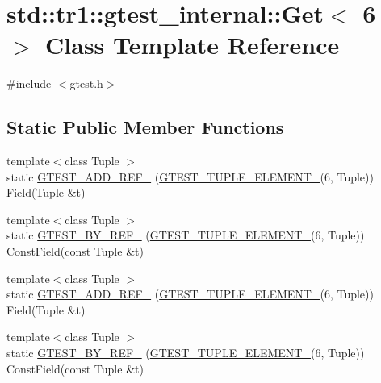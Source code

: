 \hypertarget{classstd_1_1tr1_1_1gtest__internal_1_1_get_3_016_01_4}{\section{std\-:\-:tr1\-:\-:gtest\-\_\-internal\-:\-:Get$<$ 6 $>$ Class Template Reference}
\label{classstd_1_1tr1_1_1gtest__internal_1_1_get_3_016_01_4}
}


{\ttfamily \#include $<$gtest.\-h$>$}

\subsection*{Static Public Member Functions}
\begin{DoxyCompactItemize}
\item 
{\footnotesize template$<$class Tuple $>$ }\\static \hyperlink{classstd_1_1tr1_1_1gtest__internal_1_1_get_3_016_01_4_a28034152d066c8644fa55e9fc0e3a12d}{G\-T\-E\-S\-T\-\_\-\-A\-D\-D\-\_\-\-R\-E\-F\-\_\-} (\hyperlink{gtest-tuple_8h_a1b7f133d8aa02e0b7afed7b66781eeb7}{G\-T\-E\-S\-T\-\_\-\-T\-U\-P\-L\-E\-\_\-\-E\-L\-E\-M\-E\-N\-T\-\_\-}(6, Tuple)) Field(Tuple \&t)
\item 
{\footnotesize template$<$class Tuple $>$ }\\static \hyperlink{classstd_1_1tr1_1_1gtest__internal_1_1_get_3_016_01_4_a6e396b998757e0ab9b75db0c68a7c360}{G\-T\-E\-S\-T\-\_\-\-B\-Y\-\_\-\-R\-E\-F\-\_\-} (\hyperlink{gtest-tuple_8h_a1b7f133d8aa02e0b7afed7b66781eeb7}{G\-T\-E\-S\-T\-\_\-\-T\-U\-P\-L\-E\-\_\-\-E\-L\-E\-M\-E\-N\-T\-\_\-}(6, Tuple)) Const\-Field(const Tuple \&t)
\item 
{\footnotesize template$<$class Tuple $>$ }\\static \hyperlink{classstd_1_1tr1_1_1gtest__internal_1_1_get_3_016_01_4_a28034152d066c8644fa55e9fc0e3a12d}{G\-T\-E\-S\-T\-\_\-\-A\-D\-D\-\_\-\-R\-E\-F\-\_\-} (\hyperlink{gtest-tuple_8h_a1b7f133d8aa02e0b7afed7b66781eeb7}{G\-T\-E\-S\-T\-\_\-\-T\-U\-P\-L\-E\-\_\-\-E\-L\-E\-M\-E\-N\-T\-\_\-}(6, Tuple)) Field(Tuple \&t)
\item 
{\footnotesize template$<$class Tuple $>$ }\\static \hyperlink{classstd_1_1tr1_1_1gtest__internal_1_1_get_3_016_01_4_a6e396b998757e0ab9b75db0c68a7c360}{G\-T\-E\-S\-T\-\_\-\-B\-Y\-\_\-\-R\-E\-F\-\_\-} (\hyperlink{gtest-tuple_8h_a1b7f133d8aa02e0b7afed7b66781eeb7}{G\-T\-E\-S\-T\-\_\-\-T\-U\-P\-L\-E\-\_\-\-E\-L\-E\-M\-E\-N\-T\-\_\-}(6, Tuple)) Const\-Field(const Tuple \&t)
\end{DoxyCompactItemize}



